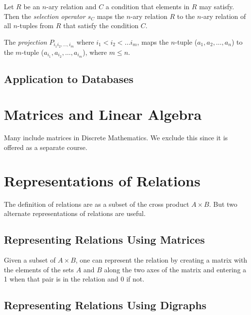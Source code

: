 \begin{definition}
Let $R$ be an $n$-ary relation and $C$ a condition that elements in $R$ may satisfy. Then the \textit{selection operator $s_C$} maps the $n$-ary relation $R$ to the $n$-ary relation of all $n$-tuples from $R$ that satisfy the condition $C$.
\end{definition}

\begin{definition}
The \textit{projection} $P_{i_1i_2, \dots ,i_m}$ where $i_1 < i_2 < \dots i_m$, maps the $n$-tuple ($a_1,a_2, \dots , a_n$) to the $m$-tuple ($a_{i_1},a_{i_2}, \dots ,a_{i_m}$), where $m \le n$.
\end{definition}

    \subsection {Application to Databases}

\section {Matrices and Linear Algebra}
Many include matrices in Discrete Mathematics. We exclude this since it is offered as a separate course.











\section{Representations of Relations}
The definition of relations are as a subset of the cross product $A \times B$. But two alternate representations of relations are useful.
  \subsection{Representing Relations Using Matrices}
  Given a subset of $A \times B$, one can represent the relation by creating a matrix with the elements of the sets $A$ and $B$ along the two axes of the matrix and entering a 1 when that pair is in the relation and 0 if not. 
  
  
  
  \subsection{Representing Relations Using Digraphs}
